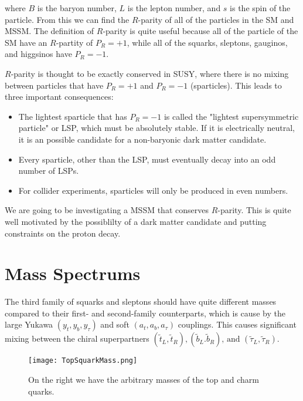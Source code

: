 where $B$ is the baryon number, $L$ is the lepton number, and $s$ is the spin of the particle. From this we can find the $R$-parity of all of the particles in the SM and MSSM. The definition of $R$-parity is quite useful because all of the particle of the SM have an $R$-partity of $P_R=+1$, while all of the squarks, sleptons, gauginos, and higgsinos have $P_R=-1$.

$R$-parity is thought to be exactly conserved in SUSY, where there is no mixing between particles that have $P_R=+1$ and $P_R=-1$ (sparticles). This leads to three important consequences:

 \begin{itemize}
	 \item The lightest sparticle that has $P_R=-1$ is called the "lightest supersymmetric particle" or LSP, which must be absolutely stable. If it is electrically neutral, it is an possible candidate for a non-baryonic dark matter candidate.
	 \item Every sparticle, other than the LSP, must eventually decay into an odd number of LSPs.
	 \item For collider experiments, sparticles will only be produced in even numbers.
 \end{itemize}
 
 We are going to be investigating a MSSM that conserves $R$-parity. This is quite well motivated by the possiblilty of a dark matter candidate and putting constraints on the proton decay. 

\section{Mass Spectrums}

The third family of squarks and sleptons should have quite different masses compared to their first- and second-family counterparts, which is cause by the large Yukawa $(y_t, y_b, y_\tau)$ and soft $(a_t, a_b, a_\tau)$ couplings. This causes significant mixing between the chiral superpartners $(\widetilde{t}_L, \widetilde{t}_R), (\widetilde{b}_L. \widetilde{b}_R)\text{, and } (\widetilde{\tau}_L, \widetilde{\tau}_R)$. 

\begin{figure}
\centering
	\texttt{[image: TopSquarkMass.png]}
 	\caption{On the right we have the arbitrary masses of the top and charm quarks.}
 	\label{StopMass} 
\end{figure}